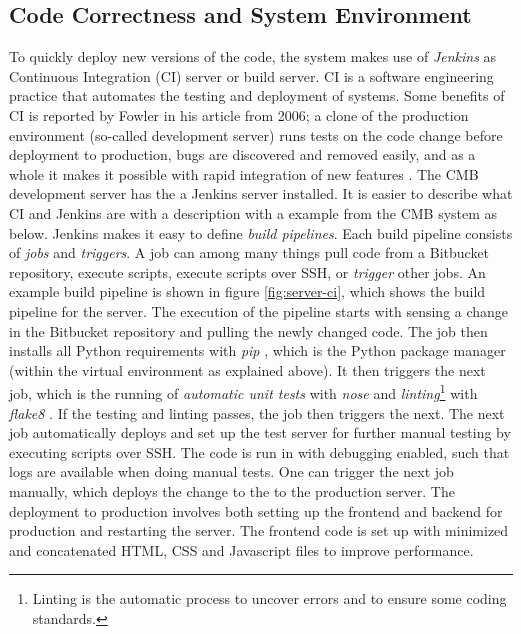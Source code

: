 \subsection{Code Correctness and System Environment}
To quickly deploy new versions of the code, the system makes use of \textit{Jenkins} \cite{m:jenkins} as Continuous Integration (CI) server or build server. CI is a software engineering practice that automates the testing and deployment of systems. Some benefits of CI is reported by Fowler in his article from 2006; a clone of the production environment (so-called development server) runs tests on the code change before deployment to production, bugs are discovered and removed easily, and as a whole it makes it possible with rapid integration of new features \cite{a:F:CI}. The CMB development server has the a Jenkins server installed. It is easier to describe what CI and Jenkins are with a description with a example from the CMB system as below. Jenkins makes it easy to define \textit{build pipelines}. Each build pipeline consists of \textit{jobs} and \textit{triggers}. A job can among many things pull code from a Bitbucket repository, execute scripts, execute scripts over SSH, or \textit{trigger} other jobs. An example build pipeline is shown in figure \ref{fig:server-ci}, which shows the build pipeline for the server. The execution of the pipeline starts with sensing a change in the Bitbucket repository and pulling the newly changed code. The job then installs all Python requirements with \textit{pip} \cite{m:pip}, which is the Python package manager (within the virtual environment as explained above). It then triggers the next job, which is the running of \textit{automatic unit tests} with \textit{nose} \cite{m:nose} and \textit{linting}\footnote{Linting is the automatic process to uncover errors and to ensure some coding standards.} with \textit{flake8} \cite{m:flake}. If the testing and linting passes, the job then triggers the next. The next job automatically deploys and set up the test server for further manual testing by executing scripts over SSH. The code is run in with debugging enabled, such that logs are available when doing manual tests. One can trigger the next job manually, which deploys the change to the to the production server. The deployment to production involves both setting up the frontend and backend for production and restarting the server. The frontend code is set up with minimized and concatenated HTML, CSS and Javascript files to improve performance. \\

